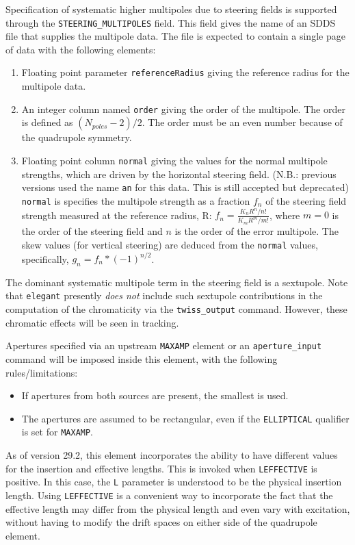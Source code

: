 Specification of systematic higher multipoles due to steering fields is
supported through the \verb|STEERING_MULTIPOLES| field.  This field gives the
name of an SDDS file that supplies the multipole data.  The file is
expected to contain a single page of data with the following elements:
\begin{enumerate}
\item Floating point parameter {\tt referenceRadius} giving the reference
 radius for the multipole data.
\item An integer column named {\tt order} giving the order of the multipole.
The order is defined as $(N_{poles}-2)/2$.  The order must be an even number
because of the quadrupole symmetry.
\item Floating point column {\tt normal} giving the values for the normal
multipole strengths, which are driven by the horizontal steering field.
(N.B.: previous versions used the name {\tt an} for this data. This is still accepted but deprecated)
{\tt normal} is specifies the multipole strength as a fraction $f_n$ of the steering field strength measured at the reference radius, R: 
$f_n = \frac{K_n R^n / n!}{K_m R^m / m!}$, where 
$m=0$ is the order of the steering field and $n$ is the order of the error multipole.
The skew values (for vertical steering) are deduced from the {\tt normal} values, specifically,
$g_n = f_n*(-1)^{n/2}$.
\end{enumerate}

The dominant systematic multipole term in the steering field is a
sextupole.  Note that {\tt elegant} presently {\em does not} include
such sextupole contributions in the computation of the chromaticity
via the {\tt twiss\_output} command.  However, these chromatic effects
will be seen in tracking.

Apertures specified via an upstream \verb|MAXAMP| element or an \verb|aperture_input|
command will be imposed inside this element, with the following rules/limitations:
\begin{itemize}
\item If apertures from both sources are present, the smallest is used.
\item The apertures are assumed to be rectangular, even if the \verb|ELLIPTICAL| qualifier
 is set for \verb|MAXAMP|.
\end{itemize}

As of version 29.2, this element incorporates the ability to have different values for the insertion
and effective lengths. This is invoked when \verb|LEFFECTIVE| is positive. In this case, the
\verb|L| parameter is understood to be the physical insertion length. Using \verb|LEFFECTIVE| is
a convenient way to incorporate the fact that the effective length may differ from the physical
length and even vary with excitation, without having to modify the drift spaces on either side of
the quadrupole element.

